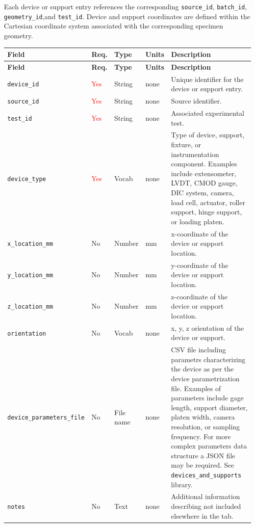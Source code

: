 \documentclass[11pt]{book}
\begin{document}
Each device or support entry references the corresponding \texttt{source\_id},
\texttt{batch\_id}, \texttt{geometry\_id},and \texttt{test\_id}. Device and support
coordinates are defined within the Cartesian coordinate system associated with the corresponding
specimen geometry.

\begin{longtable}{p{}p{}p{}p{}p{}}
\hline
\textbf{Field} &
\textbf{Req.} &
\textbf{Type} &
\textbf{Units} &
\textbf{Description} \\
\hline
\endfirsthead

\hline
\textbf{Field} &
\textbf{Req.} &
\textbf{Type} &
\textbf{Units} &
\textbf{Description} \\
\hline
\endhead

\texttt{device\_id} &
\textcolor{red}{Yes} &
String &
none &
Unique identifier for the device or support entry. \\

\texttt{source\_id} &
\textcolor{red}{Yes} &
String &
none &
Source identifier. \\

\texttt{test\_id} &
\textcolor{red}{Yes} &
String &
none &
Associated experimental test. \\


\texttt{device\_type} &
\textcolor{red}{Yes} &
Vocab &
none &
Type of device, support, fixture, or instrumentation component. Examples include extensometer,
LVDT, CMOD gauge, DIC system, camera, load cell, actuator, roller support, hinge support,
or loading platen. \\

\texttt{x\_location\_mm} &
No &
Number &
mm &
x-coordinate of the device or support location. \\

\texttt{y\_location\_mm} &
No &
Number &
mm &
y-coordinate of the device or support location. \\

\texttt{z\_location\_mm} &
No &
Number &
mm &
z-coordinate of the device or support location. \\

\texttt{orientation} &
No &
Vocab &
none &
x, y, z orientation of the device or support. \\

\texttt{device\_parameters\_file} &
No &
File name &
none &
CSV file including parametrs characterizing the device as per the device parametrization file. Examples of parameters include gage length, support
diameter, platen width, camera resolution, or sampling frequency. For more complex parameters data structure a JSON file may be required. See \texttt{devices\_and\_supports} library. \\

\texttt{notes} & No & Text & none & Additional information describing not included elsewhere in the tab. \\

\hline
\end{longtable}
\end{document}
